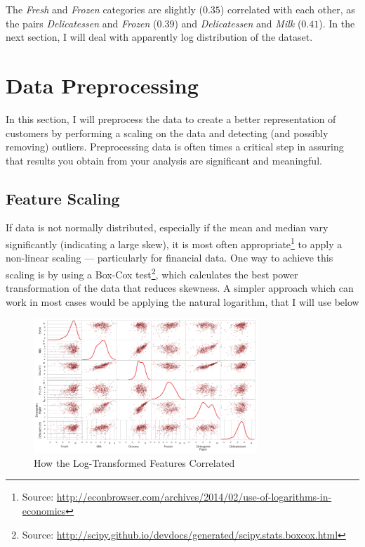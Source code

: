 \documentclass[a4paper]{article}
\begin{document}
The \textit{Fresh} and \textit{Frozen} categories are slightly ($0.35$) correlated with each other, as the pairs \textit{Delicatessen} and  \textit{Frozen} ($0.39$) and \textit{Delicatessen} and \textit{Milk} ($0.41$). In the next section, I will deal with apparently log distribution of the dataset.


\section{Data Preprocessing}
\label{sec:data_preprocessing}
In this section, I will preprocess the data to create a better representation of customers by performing a scaling on the data and detecting (and possibly removing) outliers. Preprocessing data is often times a critical step in assuring that results you obtain from your analysis are significant and meaningful.


\subsection{Feature Scaling}
If data is not normally distributed, especially if the mean and median vary significantly (indicating a large skew), it is most often appropriate\footnote{Source: \url{http://econbrowser.com/archives/2014/02/use-of-logarithms-in-economics}} to apply a non-linear scaling — particularly for financial data. One way to achieve this scaling is by using a Box-Cox test\footnote{Source: \url{http://scipy.github.io/devdocs/generated/scipy.stats.boxcox.html}}, which calculates the best power transformation of the data that reduces skewness. A simpler approach which can work in most cases would be applying the natural logarithm, that I will use below

\begin{figure}[ht!]
\centering
\includegraphics[width=0.75\textwidth]{figures/scatter_matrix_log.png}
\caption{\label{fig:log_scatter_matrix}How the Log-Transformed Features Correlated}
\end{figure}
\end{document}
